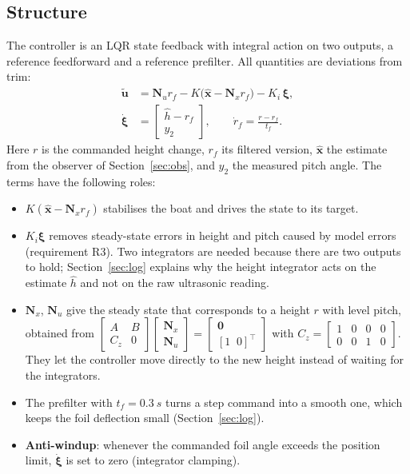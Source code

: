 \documentclass[11pt,a4paper]{article}
\newcommand{\T}{^{\top}}
\begin{document}
\subsection{Structure}

The controller is an LQR state feedback with integral action on two outputs, a
reference feedforward and a reference prefilter. All quantities are deviations
from trim:
\begin{align}
\tilde{\bm u} &= \bm N_u r_f - K\bigl(\hat{\bm x} - \bm N_x r_f\bigr) - K_i\,\bm\xi,
\label{eq:law}\\
\dot{\bm\xi} &= \begin{bmatrix}\hat h - r_f\\ y_2\end{bmatrix},
\qquad
\dot r_f = \frac{r - r_f}{t_f}.
\label{eq:int}
\end{align}
Here $r$ is the commanded height change, $r_f$ its filtered version,
$\hat{\bm x}$ the estimate from the observer of Section~\ref{sec:obs}, and
$y_2$ the measured pitch angle. The terms have the following roles:
\begin{itemize}
\item $K(\hat{\bm x}-\bm N_x r_f)$ stabilises the boat and drives the state to
      its target.
\item $K_i\bm\xi$ removes steady-state errors in height and pitch caused by model
      errors (requirement R3). Two integrators are needed because there are two
      outputs to hold; Section~\ref{sec:log} explains why the height integrator
      acts on the estimate $\hat h$ and not on the raw ultrasonic reading.
\item $\bm N_x$, $\bm N_u$ give the steady state that corresponds to a height
      $r$ with level pitch, obtained from
      $\begin{bmatrix}A & B\\ C_z & 0\end{bmatrix}
       \begin{bmatrix}\bm N_x\\ \bm N_u\end{bmatrix}
       =\begin{bmatrix}\bm 0\\ [1\;\;0]\T\end{bmatrix}$ with
      $C_z=\begin{bmatrix}1&0&0&0\\0&0&1&0\end{bmatrix}$.
      They let the controller move directly to the new height instead of waiting
      for the integrators.
\item The prefilter with $t_f=\SI{0.3}{s}$ turns a step command into a smooth
      one, which keeps the foil deflection small (Section~\ref{sec:log}).
\item \textbf{Anti-windup}: whenever the commanded foil angle exceeds the position
      limit, $\dot{\bm\xi}$ is set to zero (integrator clamping).
\end{itemize}
\end{document}
